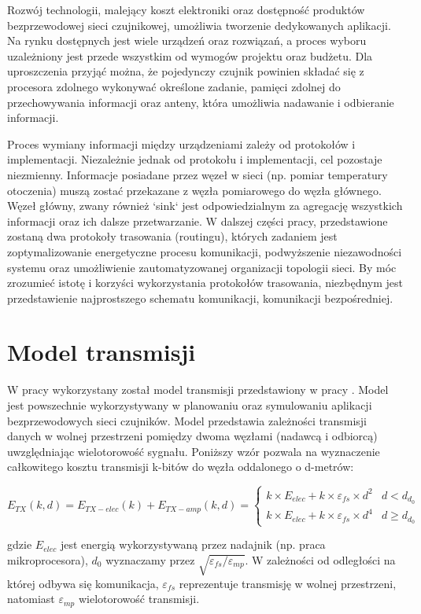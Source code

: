 \documentclass[a4paper,12pt,twoside,openany]{report}
\begin{document}
Rozwój technologii, malejący koszt elektroniki oraz dostępność produktów bezprzewodowej sieci czujnikowej, umożliwia tworzenie dedykowanych aplikacji.
Na rynku dostępnych jest wiele urządzeń oraz rozwiązań, a proces wyboru uzależniony jest przede wszystkim od wymogów projektu oraz budżetu.
Dla uproszczenia przyjąć można, że pojedynczy czujnik powinien składać się z procesora zdolnego wykonywać określone zadanie, pamięci zdolnej do przechowywania informacji
oraz anteny, która umożliwia nadawanie i odbieranie informacji.

Proces wymiany informacji między urządzeniami zależy od protokołów i implementacji.
Niezależnie jednak od protokołu i implementacji, cel pozostaje niezmienny. Informacje posiadane przez węzeł w sieci (np. pomiar temperatury otoczenia) muszą zostać przekazane z węzła pomiarowego 
do węzła głównego. Węzeł główny, zwany również `sink` jest odpowiedzialnym za agregację wszystkich informacji oraz ich dalsze przetwarzanie.  
W dalszej części pracy, przedstawione zostaną dwa protokoły trasowania (routingu), których zadaniem jest zoptymalizowanie energetyczne procesu komunikacji, podwyższenie niezawodności systemu 
oraz umożliwienie zautomatyzowanej organizacji topologii sieci.
By móc zrozumieć istotę i korzyści wykorzystania protokołów trasowania, niezbędnym jest przedstawienie najprostszego schematu komunikacji, komunikacji bezpośredniej.

\section{Model transmisji}

W pracy wykorzystany został model transmisji przedstawiony w pracy \cite{Heinzelman}.
Model jest powszechnie wykorzystywany w planowaniu oraz symulowaniu aplikacji bezprzewodowych sieci czujników.
Model przedstawia zależności transmisji danych w wolnej przestrzeni pomiędzy dwoma węzłami (nadawcą i odbiorcą) uwzględniając wielotorowość sygnału.
Poniższy wzór pozwala na wyznaczenie całkowitego kosztu transmisji k-bitów do węzła oddalonego o d-metrów:

\[
E_{TX}(k,d) = E_{TX-elec}(k) + E_{TX-amp}(k,d) = \begin{cases}
 k \times E_{elec} + k \times \varepsilon_{fs} \times d^2 & d < d_{d_{0}}\\
 k \times E_{elec} + k \times \varepsilon_{fs} \times d^4 & d \geq d_{d_{0}}
\end{cases}
\]

gdzie $E_{elec}$ jest energią wykorzystywaną przez nadajnik (np. praca mikroprocesora), $d_{0}$ wyznaczamy przez $\sqrt{\varepsilon_{fs} / \varepsilon_{mp}}$.
W zależności od odległości na której odbywa się komunikacja, $\varepsilon_{fs}$ reprezentuje transmisję w wolnej przestrzeni, natomiast $\varepsilon_{mp}$
wielotorowość transmisji.
\end{document}
